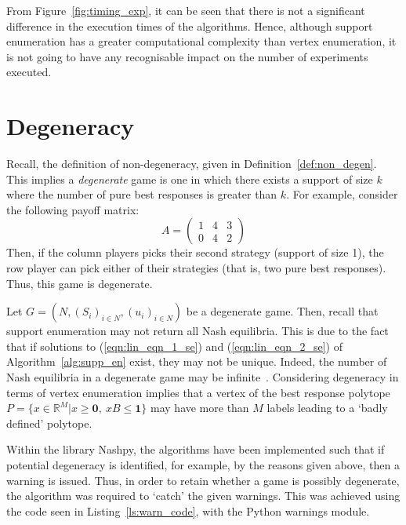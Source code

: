 From Figure~\ref{fig:timing_exp}, it can be seen that there is not a significant
difference in the execution times of the algorithms. Hence, although support
enumeration has a greater computational complexity than vertex enumeration, it
is not going to have any recognisable impact on the number of experiments
executed.


\section{Degeneracy}\label{sec:Degeneracy}
Recall, the definition of non-degeneracy, given in
Definition~\ref{def:non_degen}. This implies a \textit{degenerate} game is one in
which there exists a support of size \(k\) where the number of pure best
responses is greater than \(k\). For example, consider the following payoff
matrix:
\begin{equation}
    A = \begin{pmatrix}
        1 & 4 & 3\\
        0 & 4 & 2
    \end{pmatrix}
\end{equation}
Then, if the column players picks their second strategy (support of size 1),
the row player can pick either of their strategies (that is, two pure best
responses). Thus, this game is degenerate.

Let \(G = (N, {(S_{i})}_{i \in N}, {(u_{i})}_{i \in N})\) be a degenerate game.
Then, recall that support enumeration may not return all Nash equilibria. This
is due to the fact that if solutions to (\ref{eqn:lin_eqn_1_se}) and (\ref{eqn:lin_eqn_2_se}) of Algorithm~\ref{alg:supp_en} exist, they may not be unique. Indeed, the number of
Nash equilibria in a degenerate game may be infinite~\cite{NoamNisan2007}.
Considering degeneracy in terms of vertex enumeration implies that a vertex of
the best response polytope \(P = \{x \in \mathbb{R}^{M} | x \ge \textbf{0}, ~ xB
\le \textbf{1}\} \) may have more than \(M\) labels leading to a `badly defined'
polytope.

Within the library Nashpy, the algorithms have been implemented such that if
potential degeneracy is identified, for example, by the reasons given above, then
a warning is issued. Thus, in order to retain whether a game is possibly
degenerate, the algorithm was required to `catch' the given warnings. This
was achieved using the code seen in Listing~\ref{ls:warn_code}, with the Python
warnings module.

